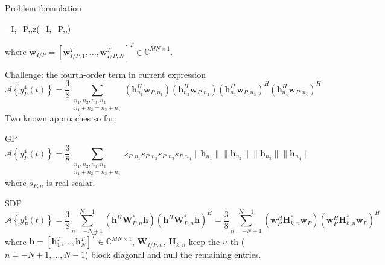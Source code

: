 \documentclass[9pt]{beamer}
\begin{document}
\begin{frame}{Problem formulation}
    \begin{maxi!}
		{_I,_P,\boldsymbol{\phi},\rho}{z(_I,_P,\boldsymbol{\phi},\rho)}{\label{op:su}}{\label{eq:su_target}}
		\label{eq:su_rate_constraint}
    \end{maxi!}
    where $\boldsymbol{w}_{I/P}=[\boldsymbol{w}_{I/P,1}^T,\dots,\boldsymbol{w}_{I/P,N}^T]^T \in \mathbb{C}^{MN \times 1}$.
\end{frame}

\begin{frame}{Challenge: the fourth-order term in current expression}
    \begin{equation}
        \mathcal{A}\left\{y_{P}^4(t)\right\} = \frac{3}{8}\sum_{\substack{{n_1},{n_2},{n_3},{n_4}\\{n_1}+{n_2}={n_3}+{n_4}}}{(\boldsymbol{h}_{{n_1}}^H\boldsymbol{w}_{P,{n_1}})(\boldsymbol{h}_{{n_2}}^H\boldsymbol{w}_{P,{n_2}})(\boldsymbol{h}_{{n_3}}^H\boldsymbol{w}_{P,{n_3}})^H(\boldsymbol{h}_{{n_4}}^H\boldsymbol{w}_{P,{n_4}})^H}
    \end{equation}
    Two known approaches so far:
    \begin{block}{GP}
        \begin{equation}
            \mathcal{A}\left\{y_{P}^4(t)\right\} = \frac{3}{8}\sum_{\substack{{n_1},{n_2},{n_3},{n_4}\\{n_1}+{n_2}={n_3}+{n_4}}}{s_{P,n_1}s_{P,n_2}s_{P,n_3}s_{P,n_4} \lVert{\boldsymbol{h}_{{n_1}}}\rVert \lVert{\boldsymbol{h}_{{n_2}}}\rVert \lVert{\boldsymbol{h}_{{n_3}}}\rVert \lVert{\boldsymbol{h}_{{n_4}}}\rVert}
        \end{equation}
        where $s_{P,n}$ is real scalar.
    \end{block}
    \begin{block}{SDP}
        \begin{equation}
            \mathcal{A}\left\{y_{P}^4(t)\right\} = \frac{3}{8}\sum_{n=-N+1}^{N-1}(\boldsymbol{h}^H\boldsymbol{W}_{P,n}^*\boldsymbol{h})(\boldsymbol{h}^H\boldsymbol{W}_{P,n}^*\boldsymbol{h})^H = \frac{3}{8}\sum_{n=-N+1}^{N-1}(\boldsymbol{w}_P^H\boldsymbol{H}_{k,n}^*\boldsymbol{w}_P)(\boldsymbol{w}_P^H\boldsymbol{H}_{k,n}^*\boldsymbol{w}_P)^H
        \end{equation}
        where $\boldsymbol{h}=[\boldsymbol{h}_{1}^T,\dots,\boldsymbol{h}_{N}^T]^T \in \mathbb{C}^{MN \times 1}$, $\boldsymbol{W}_{I/P,n}$, $\boldsymbol{H}_{k,n}$ keep the $n$-th ($n=-N+1,\dots,N-1$) block diagonal and null the remaining entries.
    \end{block}
\end{frame}
\end{document}
